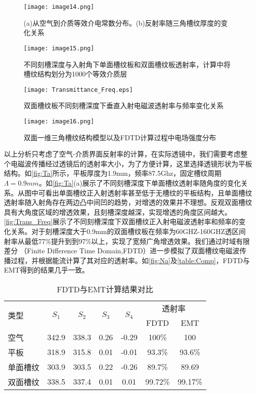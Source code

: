 \begin{figure}[ht]
\centering
\texttt{[image: image14.png]}
\caption{\label{fig:efec}(a)从空气到介质等效介电常数分布。(b)反射率随三角槽纹厚度的变化关系}
\end{figure}
\begin{figure}[ht]
\centering
\texttt{[image: image15.png]}
\caption{\label{fig:Ta}不同刻槽深度与入射角下单面槽纹板和双面槽纹板透射率，计算中将槽纹结构划分为1000个等效介质层}
\end{figure}
\begin{figure}[ht]
\centering
\texttt{[image: Transmittance\_Freq.eps]}
\caption{\label{fig:Trans_Freq}双面槽纹板不同刻槽深度下垂直入射电磁波透射率与频率变化关系}

\end{figure}
\begin{figure}[ht]
\centering
\texttt{[image: image16.png]}
\caption{\label{fig:Na}双面一维三角槽纹结构模型以及FDTD计算过程中电场强度分布}
\end{figure}


\par
以上分析只考虑了空气-介质界面反射率的计算，在实际透镜中，我们需要考虑整个电磁波传播经过透镜后的透射率大小，为了方便计算，这里选择透镜形状为平板结构。如\autoref{fig:Ta}所示，平板厚度为1.9mm，频率87.5Ghz，固定槽纹周期$Λ=0.9mm$。如\autoref{fig:Ta}(a)展示了不同刻槽深度下单面槽纹透射率随角度的变化关系。从图中可看出单面槽纹正入射透射率甚至低于无槽纹的平板结构，且单面槽纹透射率随入射角存在两边凸中间凹的趋势，对增透的效果并不理想。反观双面槽纹具有大角度区域的增透效果，且刻槽深度越深，实现增透的角度区间越大。\autoref{fig:Trans_Freq}展示了不同刻槽深度下双面槽纹正入射电磁波透射率和频率的变化关系。对于刻槽深度大于0.9mm的双面槽纹板在频率为60GHZ-160GHZ透区间射率从最低77\%提升到到97\%以上，实现了宽频广角增透效果。我们通过时域有限差分 （Finite Difference Time Domain,FDTD）进一步模拟了双面槽纹电磁波传播过程，并根据能流计算了其对应的透射率。如\autoref{fig:Na}及\autoref{table:Comp}，FDTD与EMT得到的结果几乎一致\cite{RN2060}。

\begin{table*}[h]
  \centering
  \caption{\label{table:Comp}FDTD与EMT计算结果对比}
  \label{tab:exampletable}
  \begin{tabular}{lcccccc}
    \toprule
   \multirow{2}{*}{类型}  & \multirow{2}{*}{$S_1$} & \multirow{2}{*}{$S_2$}  &  \multirow{2}{*}{$S_3$}  & \multirow{2}{*}{$S_4$}    &\multicolumn{2}{c}{透射率}
   \\

{}&{}&{}&{}&{}&FDTD&EMT\\

    \midrule
    空气 &342.9&338.3&0.26&-0.29&100\%&100 \\
    平板 & 318.9 &315.8&0.01&-0.01&93.3\%&93.6\%  \\
    单面槽纹 & 303.9 &303.5&0.22&-0.26&89.7\%&89.69   \\
双面槽纹   &338.5&337.4&0.01&0.01&99.72\%&99.17\%\\
    \bottomrule
  \end{tabular}
\end{table*}

